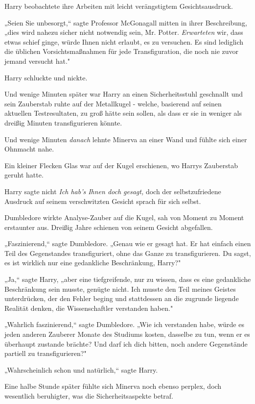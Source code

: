 {Harry beobachtete ihre Arbeiten mit leicht verängstigtem Gesichtsausdruck.

„Seien Sie unbesorgt,“ sagte Professor McGonagall mitten in ihrer Beschreibung, „dies wird nahezu sicher nicht notwendig sein, Mr. Potter. \emph{Erwarteten} wir, dass etwas schief ginge, würde Ihnen nicht erlaubt, es zu versuchen. Es sind lediglich die üblichen Vorsichtsmaßnahmen für jede Transfiguration, die noch nie zuvor jemand versucht hat."

Harry schluckte und nickte.

Und wenige Minuten später war Harry an einen Sicherheitsstuhl geschnallt und sein Zauberstab ruhte auf der Metallkugel - welche, basierend auf seinen aktuellen Testresultaten, zu groß hätte sein sollen, als dass er sie in weniger als dreißig Minuten transfigurieren könnte.

Und wenige Minuten \emph{danach} lehnte Minerva an einer Wand und fühlte sich einer Ohnmacht nahe.

Ein kleiner Flecken Glas war auf der Kugel erschienen, wo Harrys Zauberstab geruht hatte.

Harry sagte nicht \emph{Ich hab's Ihnen doch gesagt,} doch der selbstzufriedene Ausdruck auf seinem verschwitzten Gesicht sprach für sich selbst.

Dumbledore wirkte Analyse-Zauber auf die Kugel, sah von Moment zu Moment erstaunter aus. Dreißig Jahre schienen von seinem Gesicht abgefallen.

„Faszinierend,“ sagte Dumbledore. „Genau wie er gesagt hat. Er hat einfach einen Teil des Gegenstandes transfiguriert, ohne das Ganze zu transfigurieren. Du sagst, es ist wirklich nur eine gedankliche Beschränkung, Harry?"

„Ja,“ sagte Harry, „aber eine tiefgreifende, nur zu wissen, dass es eine gedankliche Beschränkung sein musste, genügte nicht. Ich musste den Teil meines Geistes unterdrücken, der den Fehler beging und stattdessen an die zugrunde liegende Realität denken, die Wissenschaftler verstanden haben."

„Wahrlich faszinierend,“ sagte Dumbledore. „Wie ich verstanden habe, würde es jeden anderen Zauberer Monate des Studiums kosten, dasselbe zu tun, wenn er es überhaupt zustande brächte? Und darf ich dich bitten, noch andere Gegenstände partiell zu transfigurieren?"

„Wahrscheinlich schon und natürlich,“ sagte Harry.

Eine halbe Stunde später fühlte sich Minerva noch ebenso perplex, doch wesentlich beruhigter, was die Sicherheitsaspekte betraf.

}
